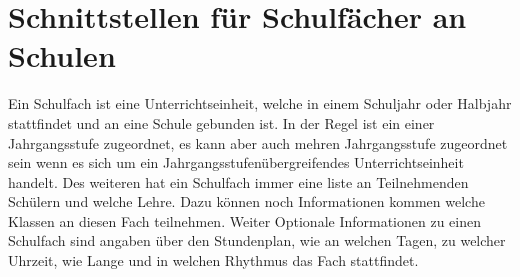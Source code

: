 \section{Schnittstellen für Schulfächer an Schulen}
Ein Schulfach ist eine Unterrichtseinheit, welche in einem Schuljahr oder Halbjahr stattfindet und an eine Schule gebunden ist.
In der Regel ist ein einer Jahrgangsstufe zugeordnet, es kann aber auch mehren Jahrgangsstufe zugeordnet sein wenn es sich um ein Jahrgangsstufenübergreifendes Unterrichtseinheit handelt.
Des weiteren hat ein Schulfach immer eine liste an Teilnehmenden Schülern und welche Lehre.
Dazu können noch Informationen kommen welche Klassen an diesen Fach teilnehmen.
Weiter Optionale Informationen zu einen Schulfach sind angaben über den Stundenplan, wie an welchen Tagen, zu welcher Uhrzeit, wie Lange und in welchen Rhythmus das Fach stattfindet.





%




